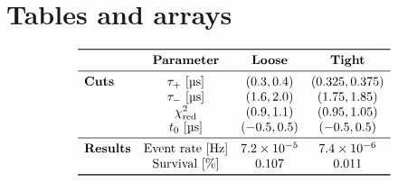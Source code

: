 \documentclass[
    prd, superscriptaddress, nofootinbib, amsmath, amssymb,
    aps, floatfix, preprintnumbers
]{revtex4-2}
\begin{document}
\section{Tables and arrays}
\begin{table}
    \centering
    \begin{equation*}
        \begin{array}{lccc}
            \toprule
                & \textnormal{\textbf{Parameter}}
                    & \textnormal{\textbf{Loose}}
                    & \textnormal{\textbf{Tight}}
            \\\midrule
                \textnormal{\textbf{Cuts}}
                    & \tau_+~[\qty{}{\micro\second}]
                        & (0.3, 0.4) & (0.325, 0.375) \\
                    & \tau_-~[\qty{}{\micro\second}]
                        & (1.6, 2.0) & (1.75, 1.85) \\
                    & \chi^2_\text{red}
                        & (0.9, 1.1)& (0.95, 1.05) \\
                    & t_0~[\qty{}{\micro\second}]
                        & (-0.5, 0.5) & (-0.5, 0.5)
            \\\midrule
                \textnormal{\textbf{Results}}
                    & \textnormal{Event rate}~[\qty{}{\hertz}]
                        & \num{7.2e-5} & \num{7.4e-6} \\
                    & \textnormal{Survival}~[\qty{}{\percent}]
                        & 0.107 & 0.011 \\
            \bottomrule
        \end{array}
    \end{equation*}
    \caption{This is a table consisting mainly of mathematical expressions.}
    \label{tab:math}
\end{table}
\end{document}
